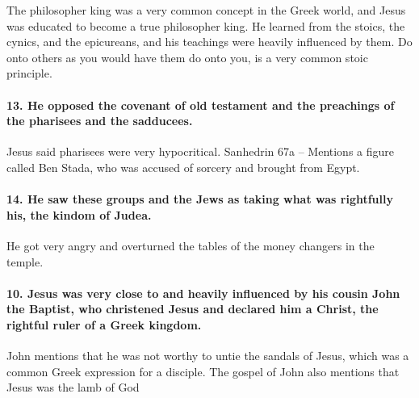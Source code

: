 The philosopher king was a very common concept in the Greek world, and Jesus was educated to become a true philosopher king.
He learned from the stoics, the cynics, and the epicureans, and his teachings were heavily influenced by them.
Do onto others as you would have them do onto you, is a very common stoic principle.

\paragraph{13.
He opposed the covenant of old testament and the preachings of the pharisees and the sadducees.}\label{par:he-opposed-the-covenant-of-old-testament-and-the-preachings-of-the-pharisees-and-the-sadducees.}

Jesus said pharisees were very hypocritical.
Sanhedrin 67a -- Mentions a figure called Ben Stada, who was accused of sorcery and brought from Egypt.

\paragraph{14.
He saw these groups and the Jews as taking what was rightfully his, the kindom of Judea.}\label{par:he-saw-these-groups-and-the-jews-as-taking-what-was-rightfully-his-the-kindom-of-judea.}

He got very angry and overturned the tables of the money changers in the temple.

\paragraph{10.
Jesus was very close to and heavily influenced by his cousin John the Baptist, who christened Jesus and declared him a Christ, the rightful ruler of a Greek kingdom.}\label{par:jesus-was-very-close-to-and-heavily-influenced-by-his-cousin-john-the-baptist-who-christened-jesus-and-declared-him-a-christ-the-rightful-ruler-of-a-greek-kingdom.}

John mentions that he was not worthy to untie the sandals of Jesus, which was a common Greek expression for a disciple.
The gospel of John also mentions that Jesus was the lamb of God
